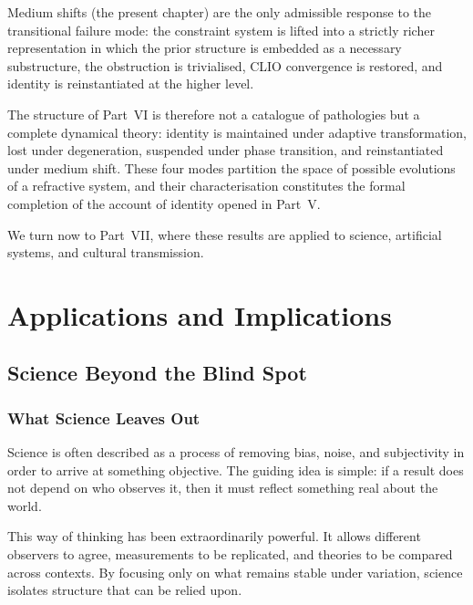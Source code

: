 \documentclass[11pt,openany]{book}
\begin{document}
Medium shifts (the present chapter) are the only
admissible response to the transitional failure mode: the
constraint system is lifted into a strictly richer
representation in which the prior structure is embedded as
a necessary substructure, the obstruction is trivialised,
CLIO convergence is restored, and identity is reinstantiated
at the higher level.

The structure of Part~VI is therefore not a catalogue of
pathologies but a complete dynamical theory: identity is
maintained under adaptive transformation, lost under
degeneration, suspended under phase transition, and
reinstantiated under medium shift.  These four modes
partition the space of possible evolutions of a refractive
system, and their characterisation constitutes the formal
completion of the account of identity opened in Part~V.

We turn now to Part~VII, where these results are applied
to science, artificial systems, and cultural transmission.


\part{Applications and Implications}


\chapter{Science Beyond the Blind Spot}
\label{ch:science}

\section*{ What Science Leaves Out}

Science is often described as a process of removing bias,
noise, and subjectivity in order to arrive at something
objective.  The guiding idea is simple: if a result does not
depend on who observes it, then it must reflect something
real about the world.

This way of thinking has been extraordinarily powerful.  It
allows different observers to agree, measurements to be
replicated, and theories to be compared across contexts.
By focusing only on what remains stable under variation,
science isolates structure that can be relied upon.
\end{document}
